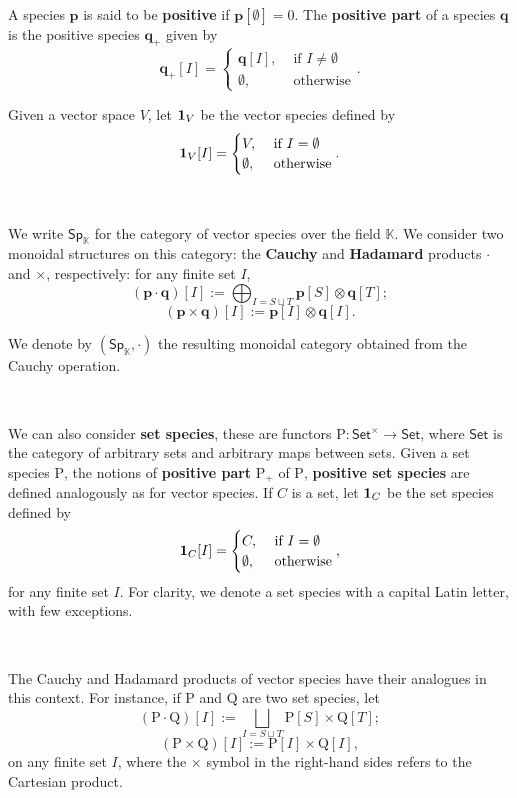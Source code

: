 \documentclass[12pt, reqno]{amsart}
\theoremstyle{definition}
\newcommand{\Fset}{\mathsf{Set^{\times}}}
\newcommand{\Set}{\mathsf{Set}}
\newcommand{\Ss}{\mathsf{Sp}} %
\newcommand{\Ssk}{\mathsf{Sp}_\Kb} %
\newcommand{\Kb}{\mathbb{K}}
\newcommand{\rP}{\mathrm{P}}
\newcommand{\rQ}{\mathrm{Q}}
\newcommand{\tp}{\mathbf{p}}
\newcommand{\tq}{\mathbf{q}}
\begin{document}
\

A species $\tp$ is said to be {\bf positive} if $\tp[\emptyset]=0$. The {\bf positive part} of a species $\tq$ is the positive species $\tq_+$ given by
\[\tq_+[I]=\begin{cases}
\tq[I],& \text{ if } I\neq \emptyset\\
\emptyset, & \text{ otherwise}
\end{cases}.\]

Given a vector space $V$, let ${\bf 1}_V$ be the vector species defined by
\[{\bf 1}_V[I]=\begin{cases}
V,& \text{ if } I= \emptyset\\
\emptyset, & \text{ otherwise}
\end{cases}.\]

\

We write $\Ss_{\mathbb{K}}$ for the category of vector species over the field $\mathbb{K}$.
We consider two monoidal structures on this category: the {\bf Cauchy} and {\bf Hadamard} products $\cdot$ and $\times$, respectively: for any finite set $I$,
\[(\tp \cdot \tq)[I]:=\bigoplus_{I = S \sqcup T}\tp[S]\otimes \tq[T];\]
\[(\tp \times \tq)[I]:=\tp[I] \otimes \tq[I].\]

We denote by $(\Ssk, \cdot)$ the resulting monoidal category obtained from the Cauchy operation.

\

We can also consider {\bf set species}, these are functors $\rP: \Fset \to \Set$, where $\Set$ is the category of arbitrary sets and arbitrary maps between sets. Given a set species $\rP$, the notions of {\bf positive part} $\rP_+$ of $\rP$, {\bf positive set species} are defined analogously as for vector species. If $C$ is a set, let ${\bf 1}_C$ be the set species defined by
\[{\bf 1}_C[I]=\begin{cases}
C,& \text{ if } I= \emptyset\\
\emptyset, & \text{ otherwise}
\end{cases},\]
for any finite set $I$.
For clarity, we denote a set species with a capital Latin letter, with few exceptions.

\

The Cauchy and Hadamard products of vector species have their analogues in this context. For instance, if $\rP$ and $\rQ$ are two set species, let
\[(\rP \cdot \rQ)[I]:=\bigsqcup_{I = S \sqcup T}\rP[S]\times \rQ[T];\]
\[(\rP \times \rQ)[I]:=\rP[I]\times  \rQ[I],\]
on any finite set $I$, where the $\times$ symbol in the right-hand sides refers to the Cartesian product.
\end{document}
